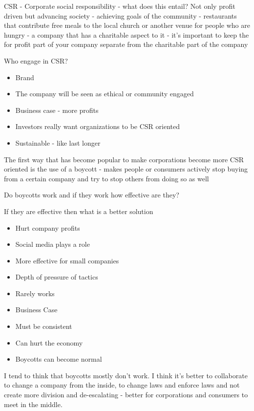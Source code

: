 \documentclass[11pt]{article}
\begin{document}
CSR - Corporate social responsibility - what does this entail? Not only profit driven but advancing society - achieving goals of the community - restaurants that contribute free meals to the local church or another venue for people who are hungry - a company that has a charitable aspect to it - it's important to keep the for profit part of your company separate from the charitable part of the company

Who engage in CSR?

\begin{itemize}
    \item Brand
    \item The company will be seen as ethical or community engaged
    \item Business case - more profits
    \item Investors really want organizations to be CSR oriented
    \item Sustainable - like last longer
\end{itemize}

The first way that has become popular to make corporations become more CSR oriented is the use of a boycott - makes people or consumers actively stop buying from a certain company and try to stop others from doing so as well


Do boycotts work and if they work how effective are they?

If they are effective then what is a better solution

\begin{itemize}
    \item Hurt company profits
    \item Social media plays a role
    \item More effective for small companies
    \item Depth of pressure of tactics
    \item Rarely works
    \item Business Case
    \item Must be consistent
    \item Can hurt the economy
    \item Boycotts can become normal
\end{itemize}

I tend to think that boycotts mostly don't work. I think it's better to collaborate to change a company from the inside, to change laws and enforce laws and not create more division and de-escalating - better for corporations and consumers to meet in the middle.
\end{document}
